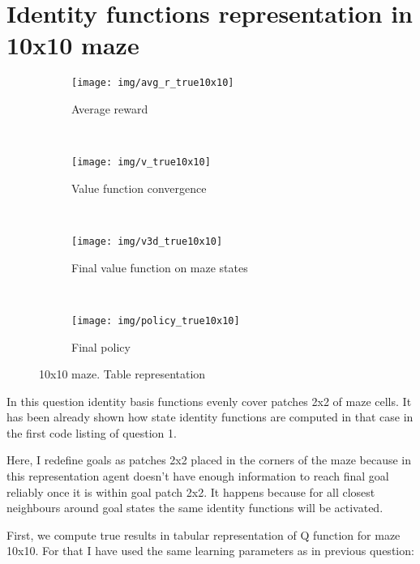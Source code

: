 \documentclass[a4paper,11pt]{article}
\theoremstyle{mytheor}
\begin{document}











\section{Identity functions representation in 10x10 maze}
\begin{figure}[htbp!]
 \centering
 \begin{subfigure}[t]{0.49\textwidth}
 	\texttt{[image: img/avg\_r\_true10x10]}
 	\caption{Average reward}
 	\label{fig:avg_r_true10x10}
 \end{subfigure}
 ~
 \centering
 \begin{subfigure}[t]{0.49\textwidth}
 	\texttt{[image: img/v\_true10x10]}
 	\caption{Value function convergence}
 	\label{fig:v_true10x10}
 \end{subfigure}
 \\
 \centering
 \begin{subfigure}[t]{0.49\textwidth}
 	\texttt{[image: img/v3d\_true10x10]}
 	\caption{Final value function on maze states}
 	\label{fig:v3d_true10x10}
 \end{subfigure} 
 ~
 \centering
 \begin{subfigure}[t]{0.49\textwidth}
 	\texttt{[image: img/policy\_true10x10]}
 	\caption{Final policy}
 	\label{fig:policy_true10x10}
 \end{subfigure} 	
 \caption{10x10 maze. Table representation}
 \label{fig:true5x5}
\end{figure}

In this question identity basis functions evenly cover patches 2x2 of maze cells. It has been already shown how state identity functions are computed in that case in the first code listing of question 1.

Here, I redefine goals as patches 2x2 placed in the corners of the maze because in this representation agent doesn't have enough information to reach final goal reliably once it is within goal patch 2x2. It happens because for all closest neighbours around goal states the same identity functions will be activated.

First, we compute true results in tabular representation of Q function for maze 10x10. For that I have used the same learning parameters as in previous question:
\end{document}
